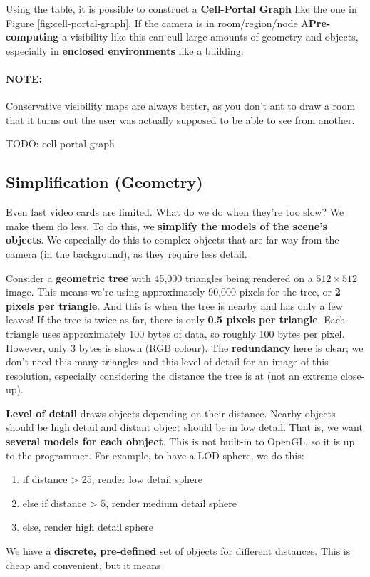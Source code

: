 \documentclass{article}
\begin{document}
Using the table, it is possible to construct a \textbf{Cell-Portal Graph} like the one in Figure \ref{fig:cell-portal-graph}. If the camera is in room/region/node A\textbf{Pre-computing} a visibility like this can cull large amounts of geometry and objects, especially in \textbf{enclosed environments} like a building.

\paragraph{\textbf{NOTE: }} Conservative visibility maps are always better, as you don't ant to draw a room that it turns out the user was actually supposed to be able to see from another.

TODO: cell-portal graph

\subsection{Simplification (Geometry)}

Even fast video cards are limited. What do we do when they're too slow? We make them do less. To do this, we \textbf{simplify the models of the scene's objects}. We especially do this to complex objects that are far way from the camera (in the background), as they require less detail.

Consider a \textbf{geometric tree} with 45,000 triangles being rendered on a $512 \times 512$ image. This means we're using approximately 90,000 pixels for the tree, or \textbf{2 pixels per triangle}.  And this is when the tree is nearby and has only a few leaves! If the tree is twice as far, there is only \textbf{0.5 pixels per triangle}. Each triangle uses approximately 100 bytes of data, so roughly 100 bytes per pixel. However, only 3 bytes is shown (RGB colour). The \textbf{redundancy} here is clear; we don't need this many triangles and this level of detail for an image of this resolution, especially considering the distance the tree is at (not an extreme close-up).

\textbf{Level of detail} draws objects depending on their distance. Nearby objects should be high detail and distant object should be in low detail. That is, we want \textbf{several models for each obnject}. This is not built-in to OpenGL, so it is up to the programmer. For example, to have a LOD sphere, we do this:
\begin{enumerate}
	\item if distance > 25, render low detail sphere
	\item else if distance > 5, render medium detail sphere
	\item else, render high detail sphere
\end{enumerate}
We have a \textbf{discrete, pre-defined} set of objects for different distances. This is cheap and convenient, but it means 
\end{document}
